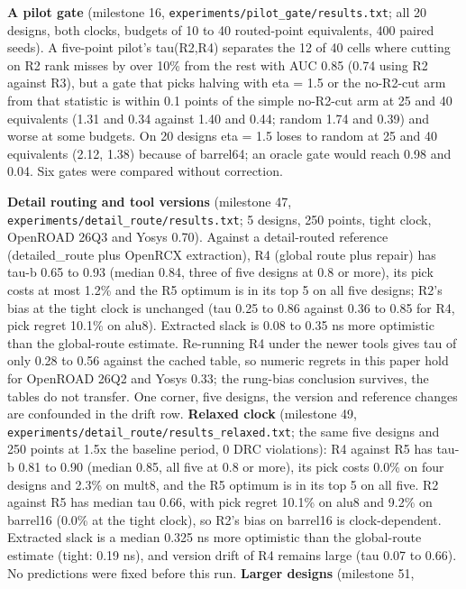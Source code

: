\documentclass[conference]{IEEEtran}
\begin{document}
\textbf{A pilot gate} (milestone 16,
\texttt{experiments/\allowbreak{}pilot\_\allowbreak{}gate/\allowbreak{}results.txt}; all 20 designs, both
clocks, budgets of 10 to 40 routed-point equivalents, 400 paired seeds).
A five-point pilot's tau(R2,R4) separates the 12 of 40 cells where
cutting on R2 rank misses by over 10\% from the rest with AUC 0.85 (0.74
using R2 against R3), but a gate that picks halving with eta = 1.5 or
the no-R2-cut arm from that statistic is within 0.1 points of the simple
no-R2-cut arm at 25 and 40 equivalents (1.31 and 0.34 against 1.40 and
0.44; random 1.74 and 0.39) and worse at some budgets. On 20 designs eta
= 1.5 loses to random at 25 and 40 equivalents (2.12, 1.38) because of
barrel64; an oracle gate would reach 0.98 and 0.04. Six gates were
compared without correction.

\textbf{Detail routing and tool versions} (milestone 47,
\texttt{experiments/\allowbreak{}detail\_\allowbreak{}route/\allowbreak{}results.txt}; 5 designs, 250 points,
tight clock, OpenROAD 26Q3 and Yosys 0.70). Against a detail-routed
reference (detailed\_route plus OpenRCX extraction), R4 (global route
plus repair) has tau-b 0.65 to 0.93 (median 0.84, three of five designs
at 0.8 or more), its pick costs at most 1.2\% and the R5 optimum is in
its top 5 on all five designs; R2's bias at the tight clock is unchanged
(tau 0.25 to 0.86 against 0.36 to 0.85 for R4, pick regret 10.1\% on
alu8). Extracted slack is 0.08 to 0.35 ns more optimistic than the
global-route estimate. Re-running R4 under the newer tools gives tau of
only 0.28 to 0.56 against the cached table, so numeric regrets in this
paper hold for OpenROAD 26Q2 and Yosys 0.33; the rung-bias conclusion
survives, the tables do not transfer. One corner, five designs, the
version and reference changes are confounded in the drift row.
\textbf{Relaxed clock} (milestone 49,
\texttt{experiments/\allowbreak{}detail\_\allowbreak{}route/\allowbreak{}results\_\allowbreak{}relaxed.txt}; the same five
designs and 250 points at 1.5x the baseline period, 0 DRC violations):
R4 against R5 has tau-b 0.81 to 0.90 (median 0.85, all five at 0.8 or
more), its pick costs 0.0\% on four designs and 2.3\% on mult8, and the
R5 optimum is in its top 5 on all five. R2 against R5 has median tau
0.66, with pick regret 10.1\% on alu8 and 9.2\% on barrel16 (0.0\% at
the tight clock), so R2's bias on barrel16 is clock-dependent. Extracted
slack is a median 0.325 ns more optimistic than the global-route
estimate (tight: 0.19 ns), and version drift of R4 remains large (tau
0.07 to 0.66). No predictions were fixed before this run. \textbf{Larger
designs} (milestone 51,
\end{document}
